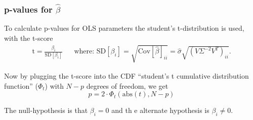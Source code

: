\subsubsection{p-values for $\hat{\beta}$}

To calculate p-values for OLS parameters the student's t-distribution is used, with the t-score \cite{t-value-ols}
\begin{align}
\mathrm{t} = \frac{\beta_i}{\mathrm{SD}[\beta_i]} && \text{where: } \mathrm{SD}[\beta_i] = \sqrt{\mathrm{Cov}[\hat{\beta}]_{ii}} = \hat{\sigma} \sqrt{ (V \Sigma^{-2} V^T)_{ii} }.
\end{align}

Now by plugging the t-score into the CDF ``student's t cumulative distribution function'' ($\Phi_t$) with $N - p$ degrees of freedom, we get
\begin{equation}
p = 2 \cdot \Phi_t\left(\mathrm{abs}(t), N-p\right)
\end{equation}

The null-hypothesis is that $\beta_i = 0$ and th  e alternate hypothesis is $\beta_i \not = 0$.
